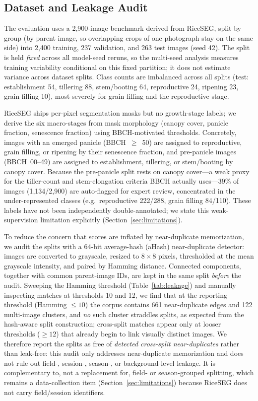 \documentclass[conference]{IEEEtran}
\begin{document}
\subsection{Dataset and Leakage Audit}

The evaluation uses a 2{,}900-image benchmark derived from RiceSEG, split by group (by parent image, so overlapping crops of one photograph stay on the same side) into 2{,}400 training, 237 validation, and 263 test images (seed 42). The split is held \emph{fixed} across all model-seed reruns, so the multi-seed analysis measures training variability conditional on this fixed partition; it does not estimate variance across dataset splits. Class counts are imbalanced across all splits (test: establishment 54, tillering 88, stem/booting 64, reproductive 24, ripening 23, grain filling 10), most severely for grain filling and the reproductive stage.

RiceSEG ships per-pixel segmentation masks but no growth-stage labels; we derive the six macro-stages from mask morphology (canopy cover, panicle fraction, senescence fraction) using BBCH-motivated thresholds. Concretely, images with an emerged panicle (BBCH~$\ge$~50) are assigned to reproductive, grain filling, or ripening by their senescence fraction, and pre-panicle images (BBCH~00--49) are assigned to establishment, tillering, or stem/booting by canopy cover. Because the pre-panicle split rests on canopy cover---a weak proxy for the tiller-count and stem-elongation criteria BBCH actually uses---39\% of images (1{,}134/2{,}900) are auto-flagged for expert review, concentrated in the under-represented classes (e.g.\ reproductive 222/288, grain filling 84/110). These labels have not been independently double-annotated; we state this weak-supervision limitation explicitly (Section~\ref{sec:limitations}).

To reduce the concern that scores are inflated by near-duplicate memorization, we audit the splits with a 64-bit average-hash (aHash) near-duplicate detector: images are converted to grayscale, resized to $8\times8$ pixels, thresholded at the mean grayscale intensity, and paired by Hamming distance. Connected components, together with common parent-image IDs, are kept in the same split \emph{before} the audit. Sweeping the Hamming threshold (Table~\ref{tab:leakage}) and manually inspecting matches at thresholds 10 and 12, we find that at the reporting threshold (Hamming $\le 10$) the corpus contains 661 near-duplicate edges and 122 multi-image clusters, and \emph{no} such cluster straddles splits, as expected from the hash-aware split construction; cross-split matches appear only at looser thresholds ($\ge 12$) that already begin to link visually distinct images. We therefore report the splits as free of \emph{detected cross-split near-duplicates} rather than leak-free: this audit only addresses near-duplicate memorization and does not rule out field-, session-, season-, or background-level leakage. It is complementary to, not a replacement for, field- or season-grouped splitting, which remains a data-collection item (Section~\ref{sec:limitations}) because RiceSEG does not carry field/session identifiers.
\end{document}
